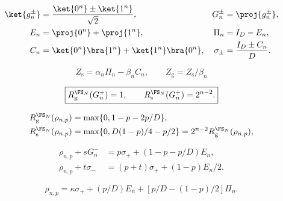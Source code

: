 
\begin{align}
 \ket{g_n^\pm}&=\frac{\ket{0^n}\pm\ket{1^n}}{\sqrt2},
 &G_n^\pm&=\proj{g_n^\pm},
 \nonumber\\
 E_n&=\proj{0^n}+\proj{1^n},
 &\Pi_n&=I_D-E_n,
 \nonumber\\
 C_n&=\ket{0^n}\bra{1^n}+\ket{1^n}\bra{0^n},
 &\sigma_\pm&=\frac{I_D\pm C_n}{D}.
 \label{eq:fs-ghz-operators}
\end{align}

\begin{equation}
 Z_{\mathrm s}=\alpha_n\Pi_n-\beta_n C_n,
 \qquad Z_{\mathrm g}=Z_{\mathrm s}/\beta_n
 \label{eq:fs-ghz-witnesses}
\end{equation}

\begin{equation}
 \boxed{R_{\mathrm g}^{\FS_N}(G_n^+)=1,\qquad
 R_{\mathrm s}^{\FS_N}(G_n^+)=2^{n-2}.}
 \label{eq:fs-ghz-values}
\end{equation}

\begin{align}
 R_{\mathrm g}^{\FS_N}(\rho_{n,p})
 &=\max\{0,1-p-2p/D\},\nonumber\\
 R_{\mathrm s}^{\FS_N}(\rho_{n,p})
 &=\max\{0,D(1-p)/4-p/2\}
 =2^{n-2}R_{\mathrm g}^{\FS_N}(\rho_{n,p}),
 \label{eq:fs-noisy-ghz-values}
\end{align}

\begin{align}
 \rho_{n,p}+sG_n^-&=p\sigma_++(1-p-p/D)E_n,\nonumber\\
 \rho_{n,p}+t\sigma_-&=(p+t)\sigma_++(1-p)E_n/2.
 \label{eq:fs-noisy-primal}
\end{align}

\begin{equation}
 \rho_{n,p}=\kappa\sigma_++(p/D)E_n+
 \left[p/D-(1-p)/2\right]\Pi_n.
 \label{eq:fs-noisy-free}
\end{equation}
